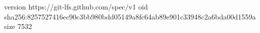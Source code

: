 version https://git-lfs.github.com/spec/v1
oid sha256:8257527416ec90c3bb980bdd05149a8fc64ab89e901c33948c2a6bda00d1559a
size 7532

